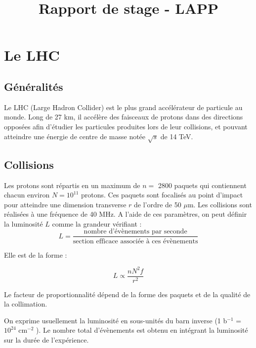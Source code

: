 \documentclass[11pt]{article} %
\title{Rapport de stage - LAPP}
\begin{document}
\maketitle

\tableofcontents

\abstract{  }
 
\section{Le LHC}

\subsection{Généralités}

Le LHC (Large Hadron Collider) est le plus grand accélérateur de particule au monde. Long de 27 km, il accélère des faisceaux de protons dans des directions opposées afin d'étudier les particules produites lors de leur collisions, et pouvant atteindre une énergie de centre de masse notée $\sqrt{s}$ de 14 TeV. 

\subsection{Collisions}

Les protons sont répartis en un maximum de $n =$ 2800 paquets qui contiennent chacun environ $N = 10^{11}$ protons. Ces paquets sont focalisés au point d'impact pour atteindre une dimension transverse $r$ de l'ordre de 50 $\mu$m. Les collisions sont réalisées à une fréquence de 40 MHz. A l'aide de ces paramètres, on peut définir la luminosité $L$ comme la grandeur vérifiant :
\begin{equation}
L = \dfrac{\mbox{nombre d'évènements par seconde}}{\mbox{section efficace associée à ces évènements}}
\end{equation}

Elle est de la forme :

\begin{equation}
L \propto \dfrac{nN^2f}{r^2}
\end{equation}

Le facteur de proportionnalité dépend de la forme des paquets et de la qualité de la collimation.

On exprime usuellement la luminosité en sous-unités du barn inverse (1 b${}^{-1}$ = $10^{24}$ cm${}^{-2}$ ).
Le nombre total d'évènements est obtenu en intégrant la luminosité sur la durée de l'expérience.
\end{document}
